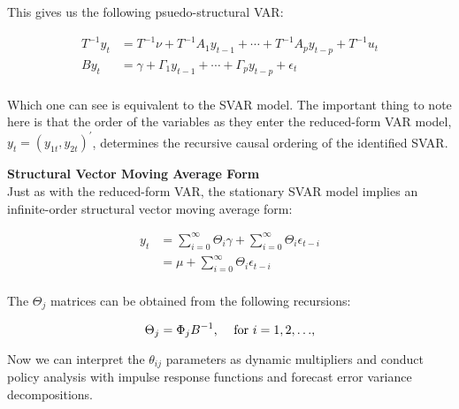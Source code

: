 \documentclass[11pt]{article}
\begin{document}
\newpage
This gives us the following psuedo-structural VAR:

\begin{align*}
 T^{-1} y_{t} &= T^{-1} \nu + T^{-1} A_{1} y_{t-1} + \cdots + T^{-1} A_{p} y_{t-p} + T^{-1} u_{t} \\
 B y_{t} &= \gamma + \Gamma_{1} y_{t-1} + \cdots + \Gamma_{p} y_{t-p} + \epsilon_{t} \\
\end{align*}

Which one can see is equivalent to the SVAR model. The important thing to note here is that the order
of the variables as they enter the reduced-form VAR model, $y_{t} = (y_{1t},  y_{2t})^{\prime}$, determines
the recursive causal ordering of the identified SVAR.

\vspace{10mm}
\textbf{Structural Vector Moving Average Form} \\

\vspace{3.5mm}
Just as with the reduced-form VAR, the stationary SVAR model implies an infinite-order structural vector moving
average form:

\vspace{2mm}
\begin{align*}
y_{t} &= \sum\limits_{i=0}^{\infty} \Theta_{i} \gamma + \sum\limits_{i=0}^{\infty} \Theta_{i} \epsilon_{t-i} \\
      &= \mu + \sum\limits_{i=0}^{\infty} \Theta_{i} \epsilon_{t-i} \\
\end{align*}

\vspace{3.5mm}
The $\Theta_{j}$ matrices can be obtained from the following recursions:

\begin{equation*}
\Theta_{j} = \Phi_{j} B^{-1} \mbox{, \quad for $i = 1, 2, \ldots$,}
\end{equation*}

\vspace{3.5mm}
Now we can interpret the $\theta_{ij}$ parameters as dynamic multipliers and conduct policy analysis with
impulse response functions and forecast error variance decompositions.
\end{document}

